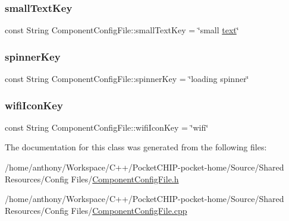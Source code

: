 \subsubsection{\texorpdfstring{small\+Text\+Key}{smallTextKey}}
{\footnotesize\ttfamily const String Component\+Config\+File\+::small\+Text\+Key = \char`\"{}small \mbox{\hyperlink{classComponentConfigFile_a9bf86058d7f64d6ba94770c3dbf3cad8ac27156a5310c2ff67c46cd3cd629eb70}{text}}\char`\"{}\hspace{0.3cm}{\ttfamily [static]}}

\mbox{\label{classComponentConfigFile_a2dc1970e3a42bc95ed6b19da3c70613a}} 
\subsubsection{\texorpdfstring{spinner\+Key}{spinnerKey}}
{\footnotesize\ttfamily const String Component\+Config\+File\+::spinner\+Key = \char`\"{}loading spinner\char`\"{}\hspace{0.3cm}{\ttfamily [static]}}

\mbox{\label{classComponentConfigFile_a5c10f5b11465272acaff46b8e10e225e}} 
\subsubsection{\texorpdfstring{wifi\+Icon\+Key}{wifiIconKey}}
{\footnotesize\ttfamily const String Component\+Config\+File\+::wifi\+Icon\+Key = \char`\"{}wifi\char`\"{}\hspace{0.3cm}{\ttfamily [static]}}



The documentation for this class was generated from the following files\+:\begin{DoxyCompactItemize}
\item 
/home/anthony/\+Workspace/\+C++/\+Pocket\+C\+H\+I\+P-\/pocket-\/home/\+Source/\+Shared Resources/\+Config Files/\mbox{\hyperlink{ComponentConfigFile_8h}{Component\+Config\+File.\+h}}\item 
/home/anthony/\+Workspace/\+C++/\+Pocket\+C\+H\+I\+P-\/pocket-\/home/\+Source/\+Shared Resources/\+Config Files/\mbox{\hyperlink{ComponentConfigFile_8cpp}{Component\+Config\+File.\+cpp}}\end{DoxyCompactItemize}
